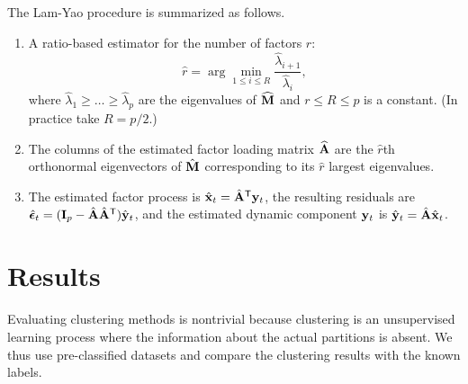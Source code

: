 \documentclass{article} %
\begin{document}
The Lam-Yao procedure is summarized as follows.
\begin{enumerate}
\item A ratio-based estimator for the number of factors $r$:
\[{\hat r}=\arg\min_{1\leq i\leq R}\frac{{\hat\lambda}_{i+1}}{{\hat\lambda}_i},\]
where ${\hat\lambda}_1\geq\ldots\geq {\hat\lambda}_p$ are the eigenvalues of ${\widehat{\bf M}}$ and $r\leq R\leq p$ is a constant. (In practice take $R=p/2$.)
\item The columns of the estimated factor loading matrix ${\widehat{\bf A}}$ are the $\hat{r}$th orthonormal eigenvectors of $\hat{\bf M}$ corresponding to its $\hat{r}$ largest eigenvalues.
\item The estimated factor process is ${\hat{\bf x}}_t={\hat{\bf A}}^{\sf T}{\bf y}_t$, the resulting residuals are $\hat{\bm\epsilon}_t=({\bf I}_p-{\hat{\bf A}}{\hat{\bf A}}^{\sf T}){\hat{\bf y}}_t$, and the estimated dynamic component ${{\bf y}}_t$ is ${\hat{\bf y}}_t={\hat{\bf A}}{\hat{\bf x}}_t$.
\end{enumerate}

\section{Results}
Evaluating clustering methods is nontrivial because clustering is an unsupervised learning process where the information about the actual partitions is absent. We thus use pre-classified datasets and compare the clustering results with the known labels. 
\end{document}
